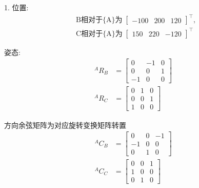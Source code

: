 \documentclass[UTF8, 12pt]{ctexart}
\begin{document}
1.
位置:
\[
    \begin{aligned}
        &\text{B相对于\{A\}为} \; \begin{bmatrix} -100 & 200 & 120 \end{bmatrix}^\top,\\
        &\text{C相对于\{A\}为} \; \begin{bmatrix} 150 & 220 & -120 \end{bmatrix}^\top
    \end{aligned}
\]

姿态:
\[
    \begin{aligned}
        {}^A R_B &= 
            \begin{bmatrix}
            0 & -1 & 0 \\
            0 & 0 & 1 \\
            -1 & 0 & 0
            \end{bmatrix} \\
        {}^A R_C &=
            \begin{bmatrix}
            0 & 1 & 0 \\
            0 & 0 & 1 \\
            1 & 0 & 0
            \end{bmatrix}
    \end{aligned}
\]

方向余弦矩阵为对应旋转变换矩阵转置
\[
\begin{aligned}
    {}^A C_B &= 
        \begin{bmatrix}
        0 & 0 & -1 \\
        -1 & 0 & 0 \\
        0 & 1 & 0
        \end{bmatrix} \\
    {}^A C_C &=
        \begin{bmatrix}
        0 & 0 & 1 \\
        1 & 0 & 0 \\
        0 & 1 & 0
        \end{bmatrix}
\end{aligned}
\]
\newpage
\end{document}
